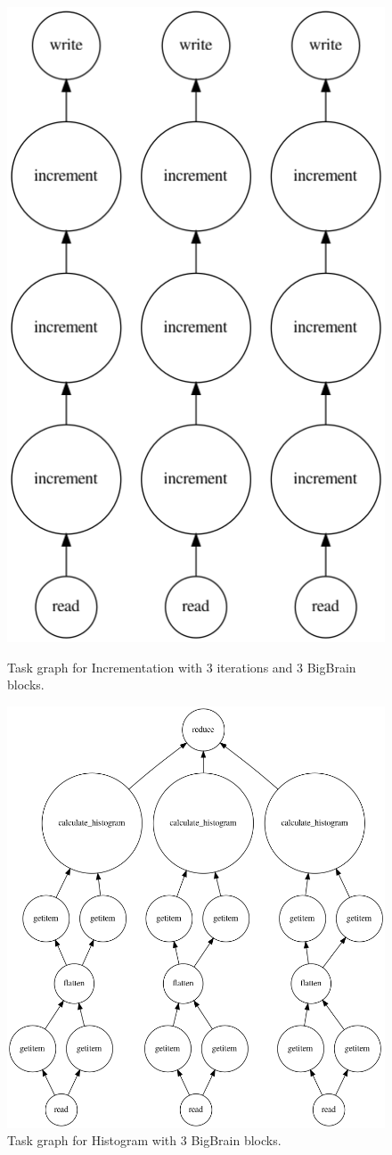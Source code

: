\documentclass[AMA,STIX1COL]{WileyNJD-v2}
\begin{document}
\begin{figure}[h]
	\centering
	\begin{minipage}{.45\textwidth}
		\centering
		\includegraphics[width=0.45\linewidth]{figures/increment.png}
		\caption{Task graph for Incrementation with 3 iterations and 3 BigBrain blocks.}
		\label{fig:graph-increment}		
	\end{minipage}
	\begin{minipage}{.45\textwidth}
		\centering
		\includegraphics[width=0.45\linewidth]{figures/histogram.png}
		\caption{Task graph for Histogram with 3 BigBrain blocks.}
		\label{fig:graph-histogram}			
	\end{minipage}
\end{figure}
					
\end{document}
